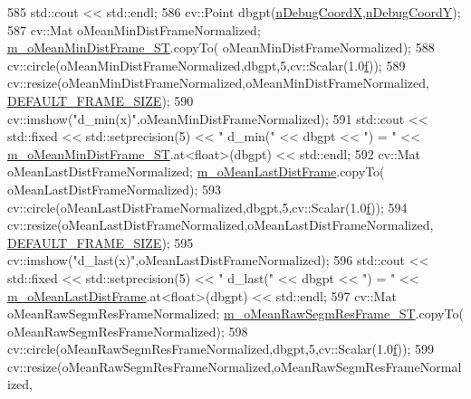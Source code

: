 \begin{DoxyCode}
585     std::cout << std::endl;
586     cv::Point dbgpt(\mbox{\hyperlink{class_background_subtractor_l_b_s_p_a49771cd7b2c8354cde3da6e593d3febe}{nDebugCoordX}},\mbox{\hyperlink{class_background_subtractor_l_b_s_p_a8e1451fd90eb4459aa84ea5e7133268a}{nDebugCoordY}});
587     cv::Mat oMeanMinDistFrameNormalized; \mbox{\hyperlink{class_background_subtractor_su_b_s_e_n_s_e_a53584c5c79017947c59d05dfd247cf5e}{m\_oMeanMinDistFrame\_ST}}.copyTo(
      oMeanMinDistFrameNormalized);
588     cv::circle(oMeanMinDistFrameNormalized,dbgpt,5,cv::Scalar(1.0\mbox{\hyperlink{rings_8cpp_a77369fc4d5326a16d2c603e032023528}{f}}));
589     cv::resize(oMeanMinDistFrameNormalized,oMeanMinDistFrameNormalized,
      \mbox{\hyperlink{_background_subtractor_su_b_s_e_n_s_e_8cpp_aee6405a4f74939fffcc9b3055af94b3a}{DEFAULT\_FRAME\_SIZE}});
590     cv::imshow(\textcolor{stringliteral}{"d\_min(x)"},oMeanMinDistFrameNormalized);
591     std::cout << std::fixed << std::setprecision(5) << \textcolor{stringliteral}{"  d\_min("} << dbgpt << \textcolor{stringliteral}{") = "} << 
      \mbox{\hyperlink{class_background_subtractor_su_b_s_e_n_s_e_a53584c5c79017947c59d05dfd247cf5e}{m\_oMeanMinDistFrame\_ST}}.at<\textcolor{keywordtype}{float}>(dbgpt) << std::endl;
592     cv::Mat oMeanLastDistFrameNormalized; \mbox{\hyperlink{class_background_subtractor_su_b_s_e_n_s_e_ad95bb91ff7ef9db725772b37d679e1a2}{m\_oMeanLastDistFrame}}.copyTo(
      oMeanLastDistFrameNormalized);
593     cv::circle(oMeanLastDistFrameNormalized,dbgpt,5,cv::Scalar(1.0\mbox{\hyperlink{rings_8cpp_a77369fc4d5326a16d2c603e032023528}{f}}));
594     cv::resize(oMeanLastDistFrameNormalized,oMeanLastDistFrameNormalized,
      \mbox{\hyperlink{_background_subtractor_su_b_s_e_n_s_e_8cpp_aee6405a4f74939fffcc9b3055af94b3a}{DEFAULT\_FRAME\_SIZE}});
595     cv::imshow(\textcolor{stringliteral}{"d\_last(x)"},oMeanLastDistFrameNormalized);
596     std::cout << std::fixed << std::setprecision(5) << \textcolor{stringliteral}{" d\_last("} << dbgpt << \textcolor{stringliteral}{") = "} << 
      \mbox{\hyperlink{class_background_subtractor_su_b_s_e_n_s_e_ad95bb91ff7ef9db725772b37d679e1a2}{m\_oMeanLastDistFrame}}.at<\textcolor{keywordtype}{float}>(dbgpt) << std::endl;
597     cv::Mat oMeanRawSegmResFrameNormalized; \mbox{\hyperlink{class_background_subtractor_su_b_s_e_n_s_e_a3c9fd9cf995eb9a7b4006467ab874958}{m\_oMeanRawSegmResFrame\_ST}}.copyTo(
      oMeanRawSegmResFrameNormalized);
598     cv::circle(oMeanRawSegmResFrameNormalized,dbgpt,5,cv::Scalar(1.0\mbox{\hyperlink{rings_8cpp_a77369fc4d5326a16d2c603e032023528}{f}}));
599     cv::resize(oMeanRawSegmResFrameNormalized,oMeanRawSegmResFrameNormalized,

\end{DoxyCode}
